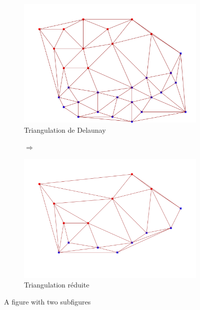 \begin{figure}[ht]
\centering
\begin{subfigure}{0.4\textwidth}
  \centering
  \includegraphics[width=\textwidth]{figures/delaunay.png}
  \caption{Triangulation de Delaunay}
  \label{fig::delaunay_tr}
\end{subfigure}%
\begin{subfigure}{0.2\textwidth}
  \centering
  $\Longrightarrow$
\end{subfigure}%
\begin{subfigure}{0.4\textwidth}
  \centering
  \includegraphics[width=\textwidth]{figures/delaunay_reduced.png}
  \caption{Triangulation réduite}
  \label{fig:delaunay_reduced}
\end{subfigure}
\caption{A figure with two subfigures}
\label{fig:delaunays}
\end{figure}

